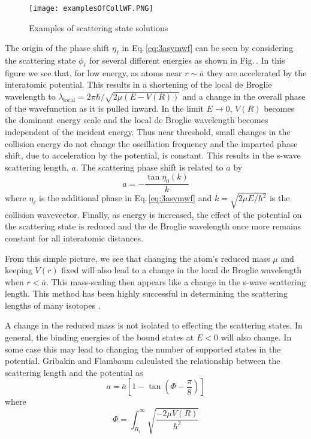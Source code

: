 \begin{figure} \label{fig:3collwf}
	\centerline{
	\texttt{[image: examplesOfCollWF.PNG]}}
	\caption{Examples of scattering state solutions}{}
\end{figure} 
The origin of the phase shift $\eta_{\ell}$ in Eq.\,\ref{eq:3asymwf} can be seen by considering the scattering state $\phi_{\ell}$ for several different energies as shown in Fig.\,\label{fig:3collwf}.
In this figure we see that, for low energy, as atoms near $r\sim\bar{a}$ they are accelerated by the interatomic potential.
This results in a shortening of the local de Broglie wavelength to $\lambda_{\text{local}} = 2\pi\hbar/\sqrt{2\mu(E-V(R))}$ and a change in the overall phase of the wavefunction as it is pulled inward.
In the limit $E\rightarrow0$, $V(R)$ becomes the dominant energy scale and the local de Broglie wavelength becomes independent of the incident energy.
Thus near threshold, small changes in the collision energy do not change the oscillation frequency and the imparted phase shift, due to acceleration by the potential, is constant.
This results in the s-wave scattering length, $a$.
The scattering phase shift is related to $a$ by
\begin{equation}
	a = -\frac{\tan \eta_0(k)}{k}
\end{equation}
where $\eta_{\ell}$ is the additional phase in Eq.\,\ref{eq:3asymwf} and $k=\sqrt{2 \mu E/\hbar^2}$ is the collision wavevector.
Finally, as energy is increased, the effect of the potential on the scattering state is reduced and the de Broglie wavelength once more remains constant for all interatomic distances.

From this simple picture, we see that changing the atom's reduced mass $\mu$ and keeping $V(r)$ fixed will also lead to a change in the local de Broglie wavelength when $r<\bar{a}$.
This mass-scaling then appears like a change in the s-wave scattering length.
This method has been highly successful in determining the scattering lengths of many isotopes \cite{Krems2009b}.

A change in the reduced mass is not isolated to effecting the scattering states.
In general, the binding energies of the bound states at $E<0$ will also change.
In some case this may lead to changing the number of supported states in the potential.
Gribakin and Flambaum \cite{gfl93} calculated the relationship between the scattering length and the potential as
\begin{equation}
	a = \bar{a} \left[ 1 - \tan(\Phi - \frac{\pi}{8}) \right]
\end{equation} 
where
\begin{equation}
	\Phi = \int_{R_i}^{\infty} \sqrt{\frac{-2\mu V(R)}{\hbar^2}}
\end{equation}

